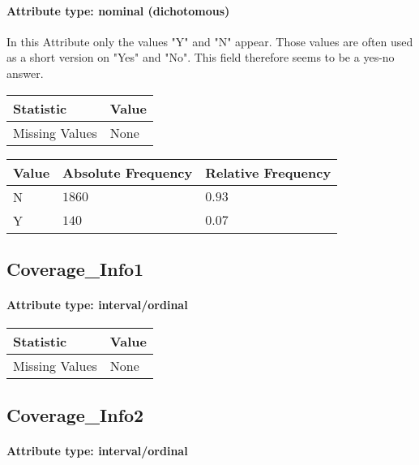 \paragraph{Attribute type: nominal (dichotomous)} In this Attribute only the values "Y" and "N" appear. Those values are often used as a short version on "Yes" and "No". This field therefore seems to be a yes-no answer.
\qquad
\begin{table}[H]
	\renewcommand{\arraystretch}{1.25}
	\begin{tabular}{l|l}
		\textbf{Statistic} & \textbf{Value}\\\hline
		Missing Values& None\\\hline
	\end{tabular}
\end{table}
\begin{table}[H]
	\renewcommand{\arraystretch}{1.25}
	\begin{tabular}{l|l|l}
		\textbf{Value} & \textbf{Absolute Frequency} & \textbf{Relative Frequency}\\\hline
		N	&$1860$&$0.93$\\\hline
		Y&	$140$&$0.07$
	\end{tabular}
\end{table}

\subsection{Coverage\_Info1}
\paragraph{Attribute type: interval/ordinal}\qquad

\begin{table}[H]
	\renewcommand{\arraystretch}{1.25}
	\begin{tabular}{l|l}
		\textbf{Statistic} & \textbf{Value}\\\hline
		Missing Values& None\\\hline
	\end{tabular}
\end{table}

\subsection{Coverage\_Info2}
\paragraph{Attribute type: interval/ordinal}
